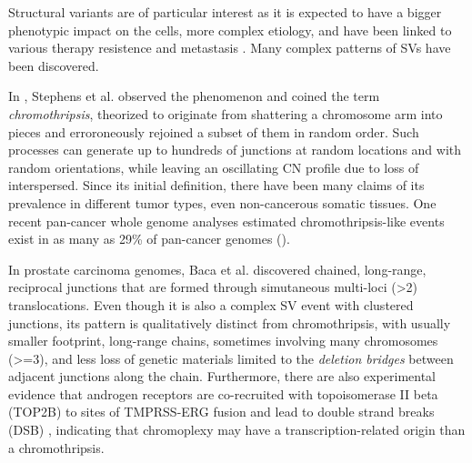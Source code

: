 \documentclass[phd,tocprelim]{cornell}
\begin{document}
Structural variants are of particular interest as it is expected to have a bigger phenotypic impact on the cells, more complex etiology, and have been linked to various therapy resistence and metastasis \cite{Wedge2018-nf,Priestley:20196a6}. Many complex patterns of SVs have been discovered.

In \cite{stephens2011}, Stephens et al. observed the phenomenon and coined the term \textit{chromothripsis}, theorized to originate from shattering a chromosome arm into pieces and erroroneously rejoined a subset of them in random order. Such processes can generate up to hundreds of junctions at random locations and with random orientations, while leaving an oscillating CN profile due to loss of interspersed. Since its initial definition, there have been many claims of its prevalence in different tumor types, even non-cancerous somatic tissues. One recent pan-cancer whole genome analyses estimated chromothripsis-like events exist in as many as 29\% of pan-cancer genomes (\cite{Cortes-Ciriano2020-fx}).

In prostate carcinoma genomes, Baca et al. \cite{baca2013} discovered chained, long-range, reciprocal junctions that are formed through simutaneous multi-loci (>2) translocations. Even though it is also a complex SV event with clustered junctions, its pattern is qualitatively distinct from chromothripsis, with usually smaller footprint, long-range chains, sometimes involving many chromosomes (>=3), and less loss of genetic materials limited to the \textit{deletion bridges} between adjacent junctions along the chain. Furthermore, there are also experimental evidence that androgen receptors are co-recruited with topoisomerase II beta (TOP2B) to sites of TMPRSS-ERG fusion and lead to double strand breaks (DSB) \cite{Haffner2010-cy}, indicating that chromoplexy may have a transcription-related origin than a chromothripsis.
\end{document}
